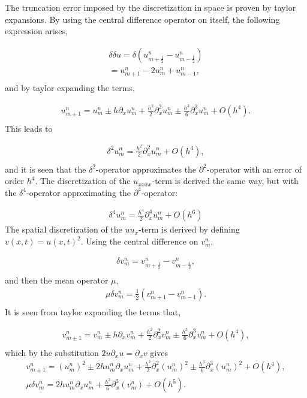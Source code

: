 The truncation error imposed by the discretization in space is proven by taylor expansions. By using the central difference operator on itself, the following expression arises,

\begin{align*}
\delta \delta u = \delta (u_{m+\frac{1}{2}}^n - u_{m-\frac{1}{2}}^ {n}) \\
= u_{m+1}^n -2u_m^n + u_{m-1}^n, \\
\end{align*}
and by taylor expanding the terms,

\begin{align*}
u_{m \pm 1}^n = u_m^n \pm h\partial_xu_m^n + \frac{h^2}{2}\partial_x^2u_m^n \pm \frac{h^3}{6}\partial_x^3u_m^n + O(h^4). \\
\end{align*}
This leads to

\begin{align*}
\delta^2 u_m^n = \frac{h^2}{2}\partial_x^2 u_m^n + O(h^4), \\
\end{align*}
and it is seen that the $\delta^2$-operator approximates the $\partial^2$-operator with an error of order $h^4$. The discretization of the $u_{xxxx}$-term is derived the same way, but with the $\delta^4$-operator approximating the $\partial^4$-operator:

\begin{align*}
\delta^4 u_m^n = \frac{h^4}{2}\partial_x^4 u_m^n + O(h^6)
\end{align*}
The spatial discretization of the $uu_{x}$-term is derived by defining $v(x,t) = u(x,t)^2$. Using the central difference on $v_{m}^n$,

\begin{align*}
\delta v_m^n = v_{m+\frac{1}{2}}^n - v_{m-\frac{1}{2}}^n, \\
\end{align*}
and then the mean operator $\mu$,
\begin{align*}
\mu\delta v_m^n = \frac{1}{2}(v_{m+1}^n - v_{m-1}^n). \\
\end{align*}
It is seen from taylor expanding the terms that,

\begin{align*}
v_{m \pm 1}^n = v_m^n \pm h\partial_xv_m^n + \frac{h^2}{2}\partial_x^2v_m^n \pm \frac{h^3}{6}\partial_x^3v_m^n + O(h^4), \\
\end{align*}
which by the substitution $2u\partial_xu = \partial_xv$ gives
\begin{align*}
v_{m \pm 1}^n = (u_m^n)^2 \pm 2hu_m^n\partial_xu_m^n + \frac{h^2}{2}\partial_x^2(u_m^n)^2 \pm \frac{h^3}{6}\partial_x^3(u_m^n)^2 + O(h^4), \\
\mu \delta v_m^n = 2hu_m^n\partial_xu_m^n + \frac{h^3}{6}\partial_{x}^3(v_m^n) + O(h^5). \\
\end{align*}

